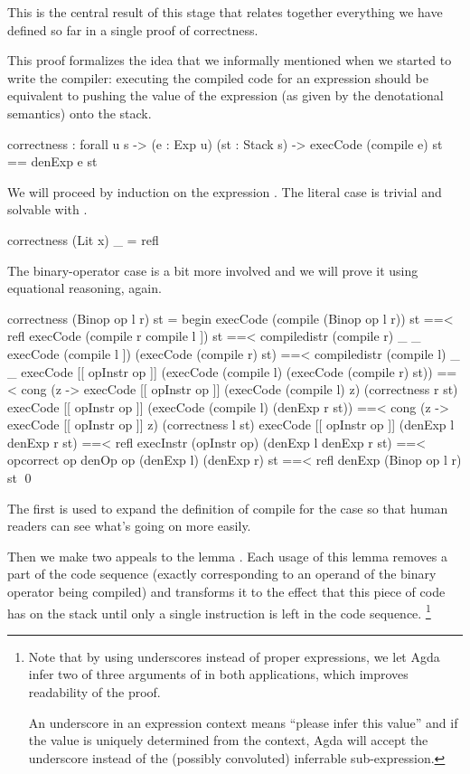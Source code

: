 This is the central result of this stage that relates together everything we
have defined so far in a single proof of correctness.

This proof formalizes the idea that we informally mentioned when we started to
write the compiler: executing the compiled code for an expression should be
equivalent to pushing the value of the expression (as given by the denotational
semantics) onto the stack.

\label{sec:cor-correctness}\begin{code}
  correctness : forall {u s}
    -> (e : Exp u) (st : Stack s)
    -> execCode (compile e) st == denExp e \scons st
\end{code}

\noindent We will proceed by induction on the expression . The literal
case is trivial and solvable with .

\begin{code}
  correctness (Lit x) _ = refl
\end{code}

\noindent The binary-operator case is a bit more involved and we will prove it
using equational reasoning, again.

\begin{code}
  correctness (Binop op l r) st = begin
    execCode (compile (Binop op l r)) st
      ==< refl \>
    execCode (compile r \app compile l \app [[ opInstr op ]]) st
      ==< compile\-distr (compile r) _ _ \>
    execCode (compile l \app [[ opInstr op ]]) (execCode (compile r) st)
      ==< compile\-distr (compile l) _ _ \>
    execCode [[ opInstr op ]] (execCode (compile l) (execCode (compile r) st))
      ==< cong (\lam z -> execCode [[ opInstr op ]] (execCode (compile l) z) (correctness r st) \>
    execCode [[ opInstr op ]] (execCode (compile l) (denExp r \scons st))
      ==< cong (\lam z -> execCode [[ opInstr op ]] z) (correctness l st) \>
    execCode [[ opInstr op ]] (denExp l \scons denExp r \scons st)
      ==< refl \>
    execInstr (opInstr op) (denExp l \scons denExp r \scons st)
      ==< op\-correct op \>
    denOp op (denExp l) (denExp r) \scons st
      ==< refl \>
    denExp (Binop op l r) \scons st
    \qed
\end{code}

\noindent The first  is used to expand the definition of compile
for the  case so that human readers can see what's going on more
easily.

Then we make two appeals to the lemma . Each usage of this
lemma removes a part of the code sequence (exactly corresponding to an operand
of the binary operator being compiled) and transforms it to the effect that this
piece of code has on the stack until only a single instruction is left in the
code sequence.%
\footnote{Note that by using underscores instead of proper expressions,
we let Agda infer two of three arguments of  in both applications,
which improves readability of the proof.

An underscore in an expression context means ``please infer this value'' and
if the value is uniquely determined from the context, Agda will accept the
underscore instead of the (possibly convoluted) inferrable sub-expression.}

